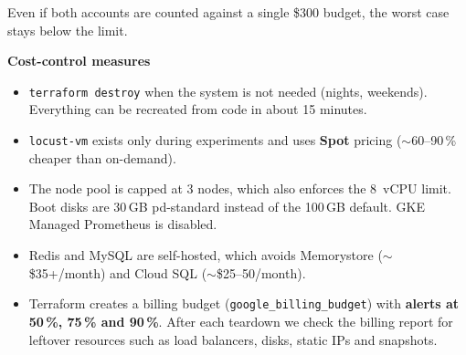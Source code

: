 \documentclass[11pt,a4paper]{article}
\newcommand{\code}[1]{\texttt{#1}}
\begin{document}
Even if both accounts are counted against a single \$300 budget, the worst
case stays below the limit.

\textbf{Cost-control measures}
\begin{itemize}
  \item \code{terraform destroy} when the system is not needed (nights,
        weekends). Everything can be recreated from code in about 15 minutes.
  \item \code{locust-vm} exists only during experiments and uses
        \textbf{Spot} pricing ($\sim$60--90\,\% cheaper than on-demand).
  \item The node pool is capped at 3 nodes, which also enforces the 8~vCPU
        limit. Boot disks are 30\,GB pd-standard instead of the 100\,GB
        default. GKE Managed Prometheus is disabled.
  \item Redis and MySQL are self-hosted, which avoids Memorystore
        ($\sim$\$35+/month) and Cloud SQL ($\sim$\$25--50/month).
  \item Terraform creates a billing budget (\code{google\_billing\_budget})
        with \textbf{alerts at 50\,\%, 75\,\% and 90\,\%}. After each
        teardown we check the billing report for leftover resources such as
        load balancers, disks, static IPs and snapshots.
\end{itemize}
\end{document}
